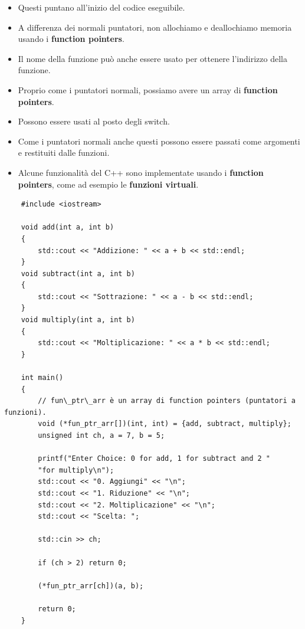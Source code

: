 \begin{itemize}
	\item \textsf{\small Questi puntano all'inizio del codice eseguibile.}
	\item \textsf{\small A differenza dei normali puntatori, non allochiamo e deallochiamo memoria usando i \textbf{function pointers}.}
	\item \textsf{\small Il nome della funzione può anche essere usato per ottenere l'indirizzo della funzione.}
	\item \textsf{\small Proprio come i puntatori normali, possiamo avere un array di \textbf{function pointers}.}
	\item \textsf{\small Possono essere usati al posto degli switch.}
	\item \textsf{\small Come i puntatori normali anche questi possono essere passati come argomenti e restituiti dalle funzioni.}
	\item \textsf{\small Alcune funzionalità del C++ sono implementate usando i \textbf{function pointers}, come ad esempio le \textbf{funzioni virtuali}.}
\end{itemize}

\begin{lstlisting}
	#include <iostream>
	
	void add(int a, int b)
	{
		std::cout << "Addizione: " << a + b << std::endl;
	}
	void subtract(int a, int b)
	{
		std::cout << "Sottrazione: " << a - b << std::endl;
	}
	void multiply(int a, int b)
	{
		std::cout << "Moltiplicazione: " << a * b << std::endl;
	}
	
	int main()
	{
		// fun\_ptr\_arr è un array di function pointers (puntatori a funzioni).
		void (*fun_ptr_arr[])(int, int) = {add, subtract, multiply};
		unsigned int ch, a = 7, b = 5;
		
		printf("Enter Choice: 0 for add, 1 for subtract and 2 "
		"for multiply\n");
		std::cout << "0. Aggiungi" << "\n";
		std::cout << "1. Riduzione" << "\n";
		std::cout << "2. Moltiplicazione" << "\n";
		std::cout << "Scelta: ";
		
		std::cin >> ch;
		
		if (ch > 2) return 0;
		
		(*fun_ptr_arr[ch])(a, b);
		
		return 0;
	}
\end{lstlisting}



